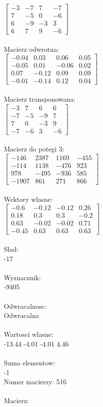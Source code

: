 \documentclass[a4paper,12pt]{article}
\begin{document}
$\begin{bmatrix} -3&-7&7&-7\\7&-5&0&-6\\6&-9&-3&3\\6&7&9&-6 \end{bmatrix}$
\\
\\
Macierz odwrotna:\\

$\begin{bmatrix} -0.04&0.03&0.06&0.05\\-0.05&0.01&-0.06&0.02\\0.07&-0.12&0.09&0.09\\-0.01&-0.14&0.12&0.04 \end{bmatrix}$
\\
\\
Macierz transponowana:\\

$\begin{bmatrix} -3&7&6&6\\-7&-5&-9&7\\7&0&-3&9\\-7&-6&3&-6 \end{bmatrix}$
\\
\\
Macierz do potegi 3:\\

$\begin{bmatrix} -146&2387&1169&-455\\-114&1138&-476&923\\978&-495&-936&585\\-1907&861&271&866 \end{bmatrix}$
\\
\\
Wektory wlasne:\\

$\begin{bmatrix} -0.6&-0.12&-0.12&0.26\\0.18&0.3&0.3&-0.2\\0.63&-0.02&-0.02&0.71\\-0.45&0.63&0.63&0.63 \end{bmatrix}$
\\
\\
Slad:\\
-17
\\
\\
Wyznacznik:\\
-9405
\\
\\
Odwracalnosc:\\
Odwracalna
\\
\\
Wartosci wlasne:\\
-13.44 -4.01 -4.01 4.46
\\
\\
Suma elementow:\\
-1
\\
\newpage
Numer macierzy:
516
\\
\\
Macierz:\\
\end{document}
